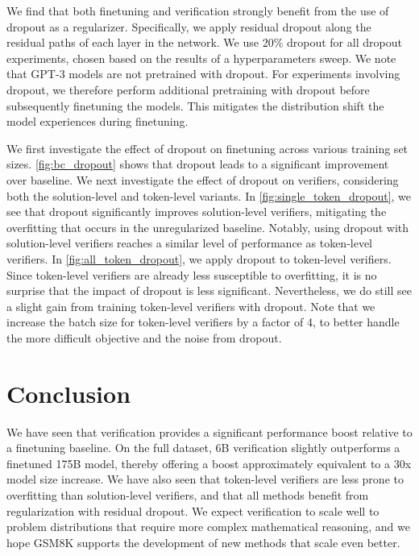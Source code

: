  We find that both finetuning and verification strongly benefit from the use of dropout as a regularizer. Specifically, we apply residual dropout \citep{vaswani2017attention} along the residual paths of each layer in the network. We use 20\% dropout for all dropout experiments, chosen based on the results of a hyperparameters sweep. We note that GPT-3 models are not pretrained with dropout. For experiments involving dropout, we therefore perform additional pretraining with dropout before subsequently finetuning the models. This mitigates the distribution shift the model experiences during finetuning.

 We first investigate the effect of dropout on finetuning across various training set sizes. \ref{fig:bc_dropout} shows that dropout leads to a significant improvement over baseline. We next investigate the effect of dropout on verifiers, considering both the solution-level and token-level variants. In \ref{fig:single_token_dropout}, we see that dropout significantly improves solution-level verifiers, mitigating the overfitting that occurs in the unregularized baseline. Notably, using dropout with solution-level verifiers reaches a similar level of performance as token-level verifiers. In \ref{fig:all_token_dropout}, we apply dropout to token-level verifiers. Since token-level verifiers are already less susceptible to overfitting, it is no surprise that the impact of dropout is less significant. Nevertheless, we do still see a slight gain from training token-level verifiers with dropout. Note that we increase the batch size for token-level verifiers by a factor of 4, to better handle the more difficult objective and the noise from dropout.

\section{Conclusion}

We have seen that verification provides a significant performance boost relative to a finetuning baseline. On the full dataset, 6B verification slightly outperforms a finetuned 175B model, thereby offering a boost approximately equivalent to a 30x model size increase. We have also seen that token-level verifiers are less prone to overfitting than solution-level verifiers, and that all methods benefit from regularization with residual dropout. We expect verification to scale well to problem distributions that require more complex mathematical reasoning, and we hope GSM8K supports the development of new methods that scale even better.



